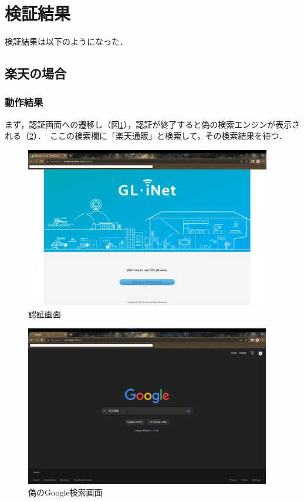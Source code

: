 \documentclass[dvipdfmx]{jsarticle}
\begin{document}
        \section{検証結果}
            検証結果は以下のようになった．
            \subsection{楽天の場合}
                \subsubsection{動作結果}
                    まず，認証画面への遷移し（図\ref{rakuten-00}），認証が終了すると偽の検索エンジンが表示される（\ref{rakuten-01}）．\
                    ここの検索欄に「楽天通販」と検索して，その検索結果を待つ．\
                    \begin{figure}[pth]
                        \centering
                        \includegraphics[height=7cm]{img/rakuten/rakuten-00.png}
                        \caption{認証画面}
                        \label{rakuten-00}
                    \end{figure}
                    \begin{figure}[pth]
                        \centering
                        \includegraphics[height=7cm]{img/rakuten/rakuten-01.png}
                        \caption{偽のGoogle検索画面}
                        \label{rakuten-01}
                    \end{figure}
\end{document}
